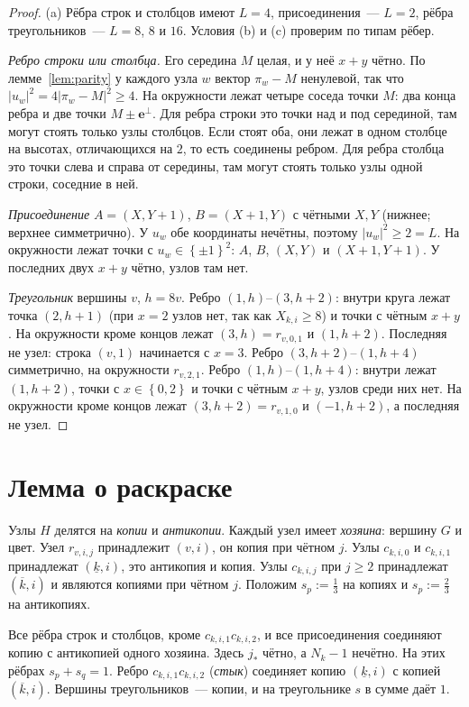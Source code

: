 \documentclass[a4paper,11pt]{article}
\theoremstyle{plain}
\theoremstyle{definition}
\theoremstyle{remark}
\newcommand{\abs}[1]{\left\lvert #1 \right\rvert}
\newcommand{\set}[1]{\left\{ #1 \right\}}
\newcommand{\e}{\mathbf e}
\begin{document}
\begin{proof}
    (a) Рёбра строк и столбцов имеют $L=4$, присоединения~--- $L=2$, рёбра треугольников~--- $L=8$, $8$ и $16$. Условия (b) и (c) проверим по типам рёбер.

    \emph{Ребро строки или столбца.} Его середина $M$ целая, и у неё $x+y$ чётно. По лемме~\ref{lem:parity} у каждого узла $w$ вектор $\pi_w-M$ ненулевой, так что $\abs{u_w}^2=4\abs{\pi_w-M}^2\ge4$. На окружности лежат четыре соседа точки $M$: два конца ребра и две точки $M\pm\e^\perp$. Для ребра строки это точки над и под серединой, там могут стоять только узлы столбцов. Если стоят оба, они лежат в одном столбце на высотах, отличающихся на $2$, то есть соединены ребром. Для ребра столбца это точки слева и справа от середины, там могут стоять только узлы одной строки, соседние в ней.

    \emph{Присоединение} $A=(X,Y+1)$, $B=(X+1,Y)$ с чётными $X,Y$ (нижнее; верхнее симметрично). У $u_w$ обе координаты нечётны, поэтому $\abs{u_w}^2\ge2=L$. На окружности лежат точки с $u_w\in\set{\pm1}^2$: $A$, $B$, $(X,Y)$ и $(X+1,Y+1)$. У последних двух $x+y$ чётно, узлов там нет.

    \emph{Треугольник} вершины $v$, $h=8v$. Ребро $(1,h)$--$(3,h+2)$: внутри круга лежат точка $(2,h+1)$ (при $x=2$ узлов нет, так как $X_{k,i}\ge8$) и точки с чётным $x+y$. На окружности кроме концов лежат $(3,h)=r_{v,0,1}$ и $(1,h+2)$. Последняя не узел: строка $(v,1)$ начинается с $x=3$. Ребро $(3,h+2)$--$(1,h+4)$ симметрично, на окружности $r_{v,2,1}$. Ребро $(1,h)$--$(1,h+4)$: внутри лежат $(1,h+2)$, точки с $x\in\set{0,2}$ и точки с чётным $x+y$, узлов среди них нет. На окружности кроме концов лежат $(3,h+2)=r_{v,1,0}$ и $(-1,h+2)$, а последняя не узел.
\end{proof}

\section{Лемма о раскраске}\label{sec:coloring}

Узлы $H$ делятся на \emph{копии} и \emph{антикопии}. Каждый узел имеет \emph{хозяина}: вершину $G$ и цвет. Узел $r_{v,i,j}$ принадлежит $(v,i)$, он копия при чётном $j$. Узлы $c_{k,i,0}$ и $c_{k,i,1}$ принадлежат $(\underline k,i)$, это антикопия и копия. Узлы $c_{k,i,j}$ при $j\ge2$ принадлежат $(\overline k,i)$ и являются копиями при чётном $j$. Положим $s_p:=\frac13$ на копиях и $s_p:=\frac23$ на антикопиях.

Все рёбра строк и столбцов, кроме $c_{k,i,1}c_{k,i,2}$, и все присоединения соединяют копию с антикопией одного хозяина. Здесь $j_*$ чётно, а $N_k-1$ нечётно. На этих рёбрах $s_p+s_q=1$. Ребро $c_{k,i,1}c_{k,i,2}$ (\emph{стык}) соединяет копию $(\underline k,i)$ с копией $(\overline k,i)$. Вершины треугольников~--- копии, и на треугольнике $s$ в сумме даёт $1$.
\end{document}
